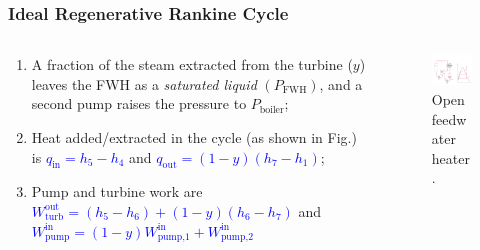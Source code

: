 \documentclass[10pt,compress]{beamer}
\begin{document}
\begin{frame}
 \frametitle{Ideal Regenerative Rankine Cycle}

  \begin{columns}
   \begin{column}[c]{0.5\linewidth}
    \begin{enumerate} %
      \item <1->  A fraction of the steam extracted from the turbine ($y$) leaves the FWH as a {\it saturated liquid} $\left(P_{\text{FWH}}\right)$, and a second pump raises the pressure to $P_{\text{boiler}}$;
      \item <2-> Heat added/extracted in the cycle (as shown in Fig.) is \textcolor{blue}{$q_{\text{in}}=h_{5}-h_{4}$} and \textcolor{blue}{$q_{\text{out}}=\left(1-y\right)\left(h_{7}-h_{1}\right)$};
      \item <3-> Pump and turbine work are \\
\medskip
       \textcolor{blue}{$W_{\text{turb}}^{\text{out}}=\left(h_{5}-h_{6}\right)+\left(1-y\right)\left(h_{6}-h_{7}\right)$}  and \\
\medskip
       \textcolor{blue}{$W_{\text{pump}}^{\text{in}}=\left(1-y\right)W_{\text{pump,1}}^{\text{in}}+W_{\text{pump,2}}^{\text{in}}$}
    \end{enumerate} 
   \end{column}

   \begin{column}[c]{0.5\linewidth} 
     \begin{figure}%
     \begin{center}
      \includegraphics[width=6.25cm,clip]{./Pics/Regenerative_Rankine_Cycle_OpenFWH}
      \caption{\scriptsize Open feedwater heater.} 
     \end{center}
    \end{figure}  
   \end{column}
  \end{columns}
 \normalsize
\end{frame}
\end{document}
